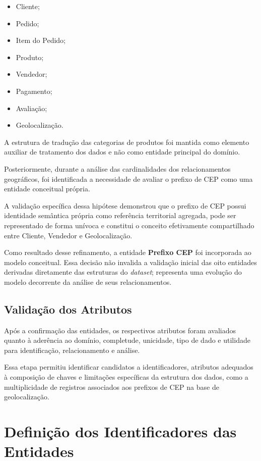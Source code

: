 \documentclass[12pt,a4paper]{article}
\begin{document}
	\begin{itemize}[leftmargin=1.2cm]
		\item Cliente;
		\item Pedido;
		\item Item do Pedido;
		\item Produto;
		\item Vendedor;
		\item Pagamento;
		\item Avaliação;
		\item Geolocalização.
	\end{itemize}
	
	A estrutura de tradução das categorias de produtos foi mantida como elemento
	auxiliar de tratamento dos dados e não como entidade principal do domínio.
	
	Posteriormente, durante a análise das cardinalidades dos relacionamentos
	geográficos, foi identificada a necessidade de avaliar o prefixo de CEP como
	uma entidade conceitual própria.
	
	A validação específica dessa hipótese demonstrou que o prefixo de CEP possui
	identidade semântica própria como referência territorial agregada, pode ser
	representado de forma unívoca e constitui o conceito efetivamente compartilhado
	entre Cliente, Vendedor e Geolocalização.
	
	Como resultado desse refinamento, a entidade \textbf{Prefixo CEP} foi
	incorporada ao modelo conceitual. Essa decisão não invalida a validação inicial
	das oito entidades derivadas diretamente das estruturas do \textit{dataset};
	representa uma evolução do modelo decorrente da análise de seus
	relacionamentos.
	
	\subsection{Validação dos Atributos}
	
	Após a confirmação das entidades, os respectivos atributos foram avaliados
	quanto à aderência ao domínio, completude, unicidade, tipo de dado e utilidade
	para identificação, relacionamento e análise.
	
	Essa etapa permitiu identificar candidatos a identificadores, atributos
	adequados à composição de chaves e limitações específicas da estrutura dos
	dados, como a multiplicidade de registros associados aos prefixos de CEP na
	base de geolocalização.
	
	\section{Definição dos Identificadores das Entidades}
	
\end{document}
